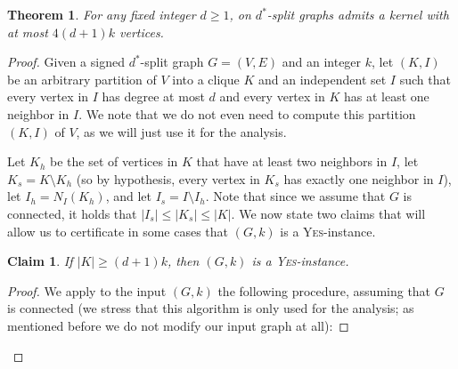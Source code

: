\documentclass[
final
]{dmtcs-episciences}
\newtheorem{theorem}{Theorem}{\bfseries}{\itshape}
\newtheorem{claimN}{Claim}{\bfseries}{\itshape}
\begin{document}
\begin{theorem}
\label{thm:linear-d-split} For any fixed integer $d \geq 1$, {} on $d^*$-split graphs admits a kernel with at most $4(d+1)k$ vertices.
\end{theorem}
\begin{proof} Given a signed $d^*$-split graph $G=(V,E)$ and an integer $k$, let $(K,I)$ be an arbitrary partition of $V$ into a clique $K$ and an independent set $I$ such that every vertex in $I$ has degree at most $d$ and every vertex in $K$ has at least one neighbor in $I$. We note that we do not even need to compute this partition $(K,I)$ of $V$, as we will just use it for the analysis.

Let $K_h$ be the set of vertices in $K$ that have at least two neighbors in $I$, let $K_s = K \setminus K_h$ (so by hypothesis, every vertex in $K_s$ has exactly one neighbor in $I$), let $I_h = N_{I}(K_h)$, and let $I_s = I \setminus I_h$. Note that since we assume that $G$ is connected, it holds that $|I_s| \leq |K_s| \leq |K|$. We now state two claims that will allow us to certificate in some cases that $(G,k)$ is a \textsc{Yes}-instance.









\begin{claimN}\label{claim:clique}
If $|K| \geq (d+1)k$, then $(G,k)$ is a \textsc{Yes}-instance.
\end{claimN}

\begin{proof} We apply to the input $(G,k)$ the following procedure, assuming that $G$ is connected (we stress that this algorithm is only used for the analysis; as mentioned before we do not modify our input graph at all):


\end{proof}
\end{proof}
\end{document}
